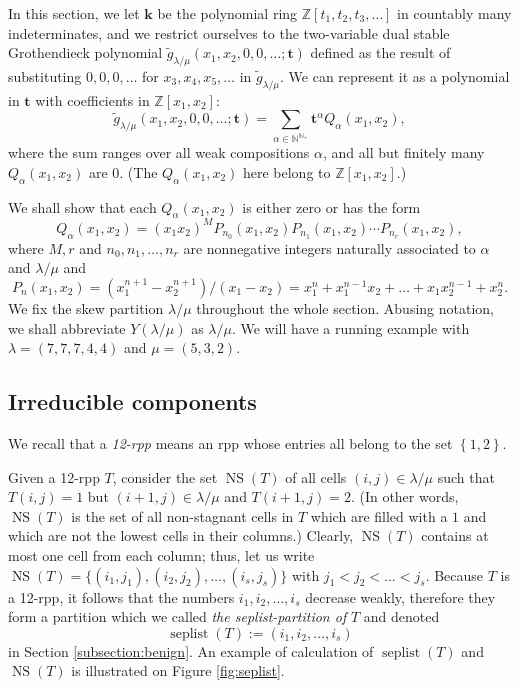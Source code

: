 \documentclass[numbers=enddot,12pt,final,onecolumn,notitlepage]{scrartcl}%
\theoremstyle{definition}
\newcommand{\kk}{\mathbf{k}}
\let\sumnonlimits\sum
\renewcommand{\sum}{\sumnonlimits\limits}
\def\seplist{{\operatorname*{seplist}}} %
\def\ceqvar{{{\alpha}}} %
\def\seplistvar{{{\nu}}} %
\def\NS{{\operatorname*{NS}}}
\def\g{{\widetilde{g}}}
\def\t{{\mathbf{t}}}
\def\lm{{\lambda/\mu}}
\def\N{{\mathbb{N}}}
\def\Z{\mathbb{Z}}
\def\OneTwoRPP{{\operatorname*{RPP}^{12}\left(  \lambda/\mu\right)}}
\def\OneTwoRPPCutvar{{\operatorname*{RPP}^{12}\left(  \lambda/\mu ;\seplistvar \right)}}
\def\flip{{\operatorname*{flip}}}
\begin{document}
\def\OneTwoRPP{{\operatorname*{RPP}^{12}\left(  \lambda/\mu\right)}}
\def\OneTwoRPPCutvar{{\operatorname*{RPP}^{12}\left(  \lambda/\mu ;\seplistvar \right)}}
\def\flip{{\operatorname*{flip}}}

In this section, we let $\kk$ be the polynomial ring
$\Z\left[t_1, t_2, t_3, \ldots\right]$ in countably many
indeterminates, and we restrict ourselves to the
two-variable dual stable Grothendieck polynomial
$\g_\lm(x_1,x_2,0,0,\dots;\t)$ defined as the result of
substituting $0, 0, 0, \ldots$ for $x_3, x_4, x_5, \ldots$
in $\g_\lm$. We can represent it as a polynomial in
$\t$ with coefficients in $\Z[x_1,x_2]$:
$$\g_\lm(x_1,x_2,0,0,\dots;\t)=\sum_{\ceqvar\in \N^{\N_+}}\t^\ceqvar Q_\ceqvar(x_1,x_2),$$
where the sum ranges over all weak compositions $\alpha$,
and all but finitely many $Q_\ceqvar(x_1,x_2)$ are $0$.
(The $Q_\ceqvar(x_1,x_2)$ here belong to $\Z[x_1, x_2]$.)

We shall show that each $Q_\ceqvar(x_1,x_2)$ is either zero or has the form
$$Q_\ceqvar(x_1,x_2)=(x_1x_2)^{M} P_{n_0}(x_1,x_2)P_{n_1}(x_1,x_2)\cdots P_{n_r}(x_1,x_2) ,$$
where $M,r$ and $n_0,n_1,\dots,n_{r}$ are nonnegative integers naturally associated to $\ceqvar$ and $\lm$ and 
$$P_n(x_1,x_2)=(x_1^{n+1}-x_2^{n+1})/(x_1-x_2)=x_1^{n}+x_1^{n-1}x_2+\dots+x_1x_2^{n-1}+x_2^n.$$
We fix the skew partition $\lm$ throughout the whole section.
Abusing notation, we shall abbreviate $Y\left(\lm\right)$ as $\lm$.
We will have a running example with $\lambda=(7,7,7,4,4)$ and $\mu=(5,3,2)$.


\subsection{Irreducible components}
We recall that a \textit{12-rpp} means an rpp whose entries all belong to the set $\left\{1, 2\right\}$. 

Given a 12-rpp $T$, consider the set $\NS(T)$ of all cells $(i,j)\in \lm$ such that $T(i,j)=1$ but $(i+1,j) \in \lm$ and $T(i+1,j)=2$. (In other words, $\NS(T)$ is the set of all non-stagnant cells in $T$ which are filled with a $1$ and which are not the lowest cells in their columns.)
Clearly, $\NS(T)$ contains at most one cell from each column; thus, let us write $\NS(T)=\{(i_1,j_1),(i_2,j_2),\dots,(i_s,j_s)\}$ with $j_1<j_2<\dots<j_s$. Because $T$ is a 12-rpp, it follows that the numbers $i_1,i_2,\dots,i_s$ decrease weakly, therefore they form a partition which we called \textit{the seplist-partition of} $T$ and denoted 
$$\seplist(T):=(i_1,i_2,\dots,i_s)$$ 
in Section \ref{subsection:benign}.
An example of calculation of $\seplist(T)$ and $\NS(T)$ is illustrated on Figure \ref{fig:seplist}. 
\end{document}
